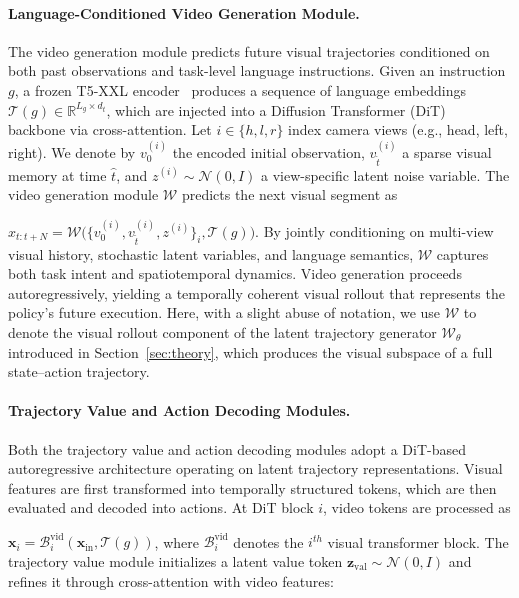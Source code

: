 
\paragraph{Language-Conditioned Video Generation Module.}
The video generation module predicts future visual trajectories conditioned on both past observations and task-level language instructions.
Given an instruction $g$, a frozen T5-XXL encoder~\citep{raffel2020exploring} produces a sequence of language embeddings
$\mathcal{T}(g) \in \mathbb{R}^{L_g \times d_t}$,
which are injected into a Diffusion Transformer (DiT)~\citep{peebles2023scalable} backbone via cross-attention.
Let $i \in \{h,l,r\}$ index camera views (e.g., head, left, right).
We denote by $\textstyle v_0^{(i)}$ the encoded initial observation, $\textstyle v_{\hat{t}}^{(i)}$ a sparse visual memory at time $\textstyle \hat{t}$, and $\textstyle z^{(i)} \sim \mathcal{N}(0,I)$ a view-specific latent noise variable.
The video generation module $\mathcal{W}$ predicts the next visual segment as

$\textstyle \hat{x}_{t:t+N} = \mathcal{W}\!\big(\{v_0^{(i)}, v_{\hat{t}}^{(i)}, z^{(i)}\}_{i}, \mathcal{T}(g)\big)$.
By jointly conditioning on multi-view visual history, stochastic latent variables, and language semantics, $\mathcal{W}$ captures both task intent and spatiotemporal dynamics.
Video generation proceeds autoregressively, yielding a temporally coherent visual rollout that represents the policy’s future execution.
Here, with a slight abuse of notation, we use $\mathcal{W}$
to denote the visual rollout component of the latent trajectory generator
$\mathcal{W}_\theta$ introduced in Section~\ref{sec:theory},
which produces the visual subspace of a full state--action trajectory.
\paragraph{Trajectory Value and Action Decoding Modules.}
Both the trajectory value and action decoding modules adopt a DiT-based autoregressive architecture operating on latent trajectory representations.
Visual features are first transformed into temporally structured tokens, which are then evaluated and decoded into actions.
At DiT block $i$, video tokens are processed as

$\mathbf{x}_i = \mathcal{B}_i^{\mathrm{vid}}\left(\mathbf{x}_{\mathrm{in}}, \mathcal{T}(g)\right)$,
where $\mathcal{B}_i^{\mathrm{vid}}$ denotes the $i^{th}$ visual transformer block.
The trajectory value module initializes a latent value token
$\mathbf{z}_{\mathrm{val}} \sim \mathcal{N}(0,I)$
and refines it through cross-attention with video features:

